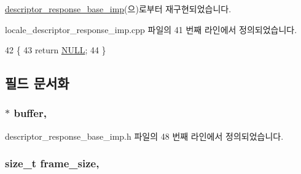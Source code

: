 \hyperlink{classavdecc__lib_1_1descriptor__response__base__imp_a15837e3eb254ad44812cb766ae8cd53c}{descriptor\+\_\+response\+\_\+base\+\_\+imp}(으)로부터 재구현되었습니다.



locale\+\_\+descriptor\+\_\+response\+\_\+imp.\+cpp 파일의 41 번째 라인에서 정의되었습니다.


\begin{DoxyCode}
42 \{
43     \textcolor{keywordflow}{return} \hyperlink{openavb__types__base__pub_8h_a070d2ce7b6bb7e5c05602aa8c308d0c4}{NULL};
44 \}
\end{DoxyCode}


\subsection{필드 문서화}
\subsubsection[{\texorpdfstring{buffer}{buffer}}]{$\ast$ buffer\hspace{0.3cm}{\ttfamily [protected]}, {\ttfamily [inherited]}}\hypertarget{classavdecc__lib_1_1descriptor__response__base__imp_a56ed84df35de10bdb65e72b184309497}{}\label{classavdecc__lib_1_1descriptor__response__base__imp_a56ed84df35de10bdb65e72b184309497}


descriptor\+\_\+response\+\_\+base\+\_\+imp.\+h 파일의 48 번째 라인에서 정의되었습니다.

\subsubsection[{\texorpdfstring{frame\+\_\+size}{frame_size}}]{\setlength{\rightskip}{0pt plus 5cm}size\+\_\+t frame\+\_\+size\hspace{0.3cm}{\ttfamily [protected]}, {\ttfamily [inherited]}}\hypertarget{classavdecc__lib_1_1descriptor__response__base__imp_affd041a595cabab98275245b9cb2824d}{}\label{classavdecc__lib_1_1descriptor__response__base__imp_affd041a595cabab98275245b9cb2824d}


